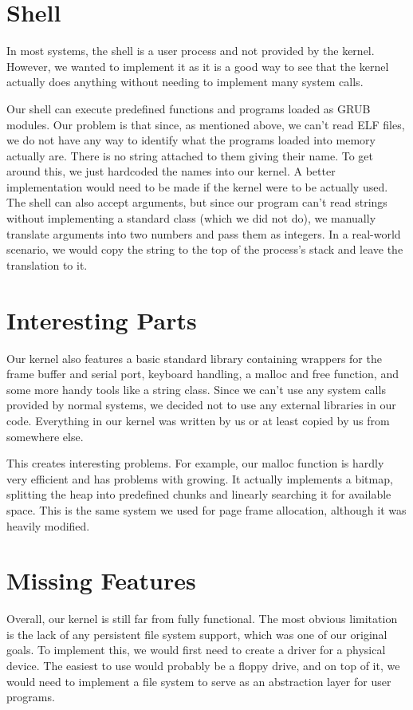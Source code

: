 \documentclass{article}
\begin{document}
\section{Shell}
In most systems, the shell is a user process and not provided by the kernel. However, we wanted to implement it as it is a good way to see that the kernel actually does anything without needing to implement many system calls. 

Our shell can execute predefined functions and programs loaded as GRUB modules. Our problem is that since, as mentioned above, we can't read ELF files, we do not have any way to identify what the programs loaded into memory actually are. There is no string attached to them giving their name. To get around this, we just hardcoded the names into our kernel. A better implementation would need to be made if the kernel were to be actually used. The shell can also accept arguments, but since our program can't read strings without implementing a standard class (which we did not do), we manually translate arguments into two numbers and pass them as integers. In a real-world scenario, we would copy the string to the top of the process's stack and leave the translation to it.

\section{Interesting Parts}
Our kernel also features a basic standard library containing wrappers for the frame buffer and serial port, keyboard handling, a malloc and free function, and some more handy tools like a string class. Since we can't use any system calls provided by normal systems, we decided not to use any external libraries in our code. Everything in our kernel was written by us or at least copied by us from somewhere else. 

This creates interesting problems. For example, our malloc function is hardly very efficient and has problems with growing. It actually implements a bitmap, splitting the heap into predefined chunks and linearly searching it for available space. This is the same system we used for page frame allocation, although it was heavily modified.

\section{Missing Features}

Overall, our kernel is still far from fully functional. The most obvious limitation is the lack of any persistent file system support, which was one of our original goals. To implement this, we would first need to create a driver for a physical device. The easiest to use would probably be a floppy drive, and on top of it, we would need to implement a file system to serve as an abstraction layer for user programs.
\end{document}
